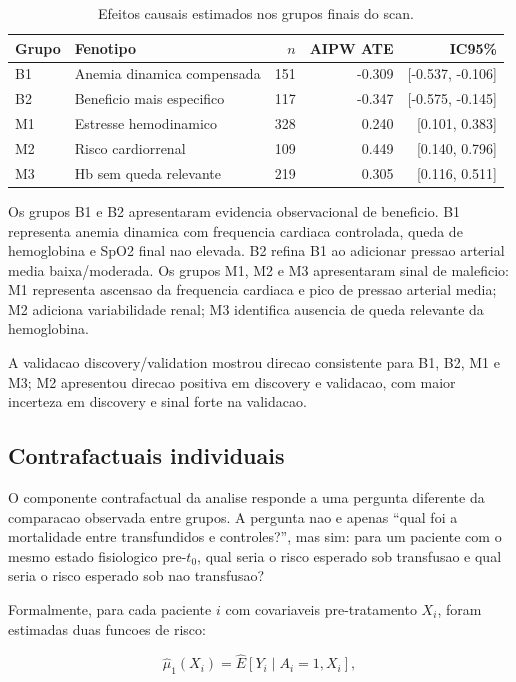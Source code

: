 \begin{table}[htbp]
\centering
\small
\caption{Efeitos causais estimados nos grupos finais do scan.}
\begin{tabular}{llrrr}
\toprule
Grupo & Fenotipo & $n$ & AIPW ATE & IC95\% \\
\midrule
B1 & Anemia dinamica compensada & 151 & -0.309 & [-0.537, -0.106] \\
B2 & Beneficio mais especifico & 117 & -0.347 & [-0.575, -0.145] \\
M1 & Estresse hemodinamico & 328 & 0.240 & [0.101, 0.383] \\
M2 & Risco cardiorrenal & 109 & 0.449 & [0.140, 0.796] \\
M3 & Hb sem queda relevante & 219 & 0.305 & [0.116, 0.511] \\
\bottomrule
\end{tabular}
\end{table}

Os grupos B1 e B2 apresentaram evidencia observacional de beneficio. B1 representa anemia dinamica com frequencia cardiaca controlada, queda de hemoglobina e SpO2 final nao elevada. B2 refina B1 ao adicionar pressao arterial media baixa/moderada. Os grupos M1, M2 e M3 apresentaram sinal de maleficio: M1 representa ascensao da frequencia cardiaca e pico de pressao arterial media; M2 adiciona variabilidade renal; M3 identifica ausencia de queda relevante da hemoglobina.

A validacao discovery/validation mostrou direcao consistente para B1, B2, M1 e M3; M2 apresentou direcao positiva em discovery e validacao, com maior incerteza em discovery e sinal forte na validacao.

\subsection{Contrafactuais individuais}

O componente contrafactual da analise responde a uma pergunta diferente da comparacao observada entre grupos. A pergunta nao e apenas ``qual foi a mortalidade entre transfundidos e controles?'', mas sim: para um paciente com o mesmo estado fisiologico pre-$t_0$, qual seria o risco esperado sob transfusao e qual seria o risco esperado sob nao transfusao?

Formalmente, para cada paciente $i$ com covariaveis pre-tratamento $X_i$, foram estimadas duas funcoes de risco:

\[
\hat\mu_1(X_i) = \widehat{E}[Y_i \mid A_i=1, X_i],
\]

